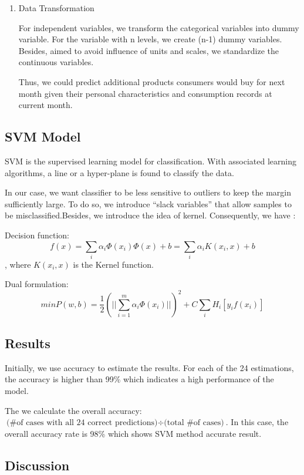 \documentclass{article}
\begin{document}
\begin{spacing}{1}
\begin{large}
\begin{enumerate}
	\item Data Transformation

	For independent variables, we transform the categorical variables into dummy variable. For the variable with n levels, we create (n-1) dummy variables. Besides, aimed to avoid influence of units and scales, we standardize the continuous variables.

	Thus, we could predict additional products consumers would buy for next month given their personal characteristics and consumption records at current month.
\end{enumerate}

\subsection{SVM Model}

SVM is the supervised learning model for classification. With associated learning algorithms, a line or a hyper-plane is found to classify the data.

In our case, we want classifier to be less sensitive to outliers to keep the margin sufficiently large. To do so, we introduce “slack variables” that allow samples to be misclassified.Besides, we introduce the idea of kernel. Consequently, we have :

Decision function:
$$f(x) = \displaystyle\sum_{i}\alpha_i\Phi(x_i)\Phi(x)+b = \displaystyle\sum_{i}\alpha_{i} K(x_i, x)+b$$, where $K(x_i, x)$ is the Kernel function.

Dual formulation:
$$min P(w,b) = \frac{1}{2}(||\displaystyle\sum_{i=1}^{m}\alpha_i\Phi(x_i)||)^2 + C\displaystyle\sum_{i}H_{i}[y_{i}f(x_i)]$$

\subsection{Results}

Initially, we use accuracy to estimate the results. For each of the 24 estimations, the accuracy is higher than 99\% which indicates a high performance of the model.

The we calculate the overall accuracy: $\text{(\# of cases with all 24 correct predictions)} \div \text{(total \# of cases)}$. In this case, the overall accuracy rate is 98\% which shows SVM method accurate result.

\subsection{Discussion}


\end{large}
\end{spacing}
\end{document}

